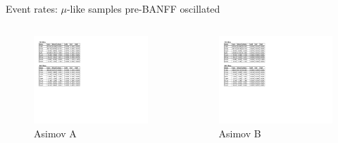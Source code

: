 \documentclass{beamer}
\begin{document}
\begin{frame}{Event rates: $\mu$-like samples pre-BANFF oscillated}
	\centering

	\begin{columns}
		\begin{column}{0.5\paperwidth}
			\begin{figure}
				\includegraphics[page=1, trim={0cm 9cm 13cm 1cm}, clip, scale=0.52] {images/rates/prefit_A}
				\caption*{Asimov A}
			\end{figure}
		\end{column}
		\begin{column}{0.5\paperwidth}
			\begin{figure}
				\includegraphics[page=1, trim={0cm 9cm 13cm 1cm}, clip, scale=0.52] {images/rates/prefit_A}
				\caption*{Asimov B}
			\end{figure}
		\end{column}
	\end{columns}
\end{frame}
\end{document}
